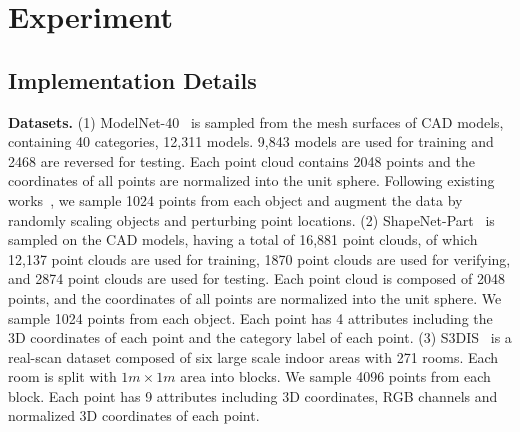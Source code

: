 \documentclass[journal]{IEEEtran}
\begin{document}
\section{Experiment} \label{sec:exp}

\subsection{Implementation Details}
\textbf{Datasets.}
(1) ModelNet-40~\cite{wu20153d} is sampled from the mesh surfaces of CAD models, containing 40 categories, 12,311 models. 9,843 models are used for training and 2468 are reversed for testing. Each point cloud contains 2048 points and the coordinates of all points are normalized into the unit sphere. Following existing works~\cite{wang2019dynamic, zheng2020parameter}, we sample 1024 points from each object and augment the data by randomly scaling objects and perturbing point locations. (2) ShapeNet-Part~\cite{2015shapenet} is sampled on the CAD models, having a total of 16,881 point clouds, of which 12,137 point clouds are used for training, 1870 point clouds are used for verifying, and 2874 point clouds are used for testing. Each point cloud is composed of 2048 points, and the coordinates of all points are normalized into the unit sphere. We sample 1024 points from each object. Each point has 4 attributes including the 3D coordinates of each point
and the category label of each point. (3) S3DIS~\cite{armeni20163d} is a real-scan dataset composed of six large scale indoor areas with 271 rooms. Each room is split with $1m \times 1m$ area into blocks. We sample 4096 points from each block. Each point has 9 attributes including 3D coordinates, RGB channels and normalized 3D coordinates of each point. 
\end{document}

